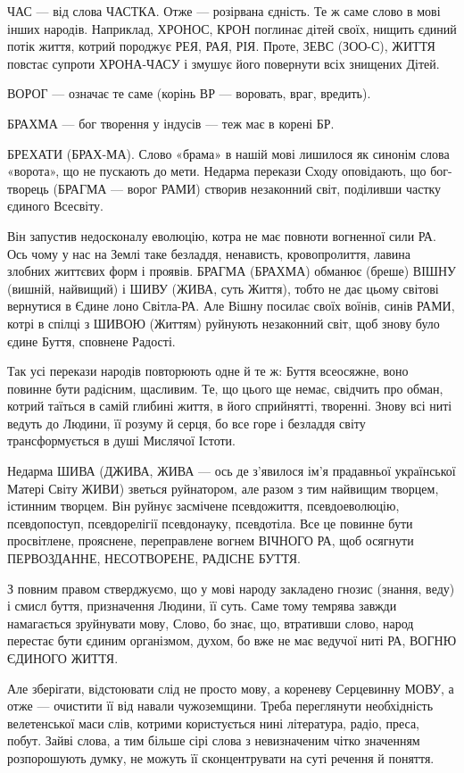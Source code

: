 ЧАС — від слова ЧАСТКА. Отже — розірвана єдність. Те ж саме слово в мові інших
народів. Наприклад, ХРОНОС, КРОН поглинає дітей своїх, нищить єдиний потік
життя, котрий породжує РЕЯ, РАЯ, РІЯ. Проте, ЗЕВС (ЗОО-С), ЖИТТЯ повстає
супроти ХРОНА-ЧАСУ і змушує його повернути всіх знищених Дітей.

ВОРОГ — означає те саме (корінь ВР — воровать, враг, вредить).

БРАХМА — бог творення у індусів — теж має в корені БР.

БРЕХАТИ (БРАХ-МА). Слово «брама» в нашій мові лишилося як синонім слова
«ворота», що не пускають до мети. Недарма перекази Сходу оповідають, що
бог-творець (БРАГМА — ворог РАМИ) створив незаконний світ, поділивши частку
єдиного Всесвіту.

Він запустив недосконалу еволюцію, котра не має повноти вогненної сили РА. Ось
чому у нас на Землі таке безладдя, ненависть, кровопролиття, лавина злобних
життєвих форм і проявів. БРАГМА (БРАХМА) обманює (бреше) ВІШНУ (вишній,
найвищий) і ШИВУ (ЖИВА, суть Життя), тобто не дає цьому світові вернутися в
Єдине лоно Світла-РА. Але Вішну посилає своїх воїнів, синів РАМИ, котрі в
спілці з ШИВОЮ (Життям) руйнують незаконний світ, щоб знову було єдине Буття,
сповнене Радості.

Так усі перекази народів повторюють одне й те ж: Буття всеосяжне, воно повинне
бути радісним, щасливим. Те, що цього ще немає, свідчить про обман, котрий
таїться в самій глибині життя, в його сприйнятті, творенні. Знову всі ниті
ведуть до Людини, її розуму й серця, бо все горе і безладдя світу
трансформується в душі Мислячої Істоти.

Недарма ШИВА (ДЖИВА, ЖИВА — ось де з’явилося ім’я прадавньої української Матері
Світу ЖИВИ) зветься руйнатором, але разом з тим найвищим творцем, істинним
творцем. Він руйнує засмічене псевдожиття, псевдоеволюцію, псевдопоступ,
псевдорелігії псевдонауку, псевдотіла. Все це повинне бути просвітлене,
прояснене, переправлене вогнем ВІЧНОГО РА, щоб осягнути ПЕРВОЗДАННЕ,
НЕСОТВОРЕНЕ, РАДІСНЕ БУТТЯ.

З повним правом стверджуємо, що у мові народу закладено гнозис (знання, веду) і
смисл буття, призначення Людини, її суть. Саме тому темрява завжди намагається
зруйнувати мову, Слово, бо знає, що, втративши слово, народ перестає бути
єдиним організмом, духом, бо вже не має ведучої ниті РА, ВОГНЮ ЄДИНОГО ЖИТТЯ.

Але зберігати, відстоювати слід не просто мову, а кореневу Серцевинну МОВУ, а
отже — очистити її від навали чужоземщини. Треба переглянути необхідність
велетенської маси слів, котрими користується нині література, радіо, преса,
побут. Зайві слова, а тим більше сірі слова з невизначеним чітко значенням
розпорошують думку, не можуть її сконцентрувати на суті речення й поняття.

